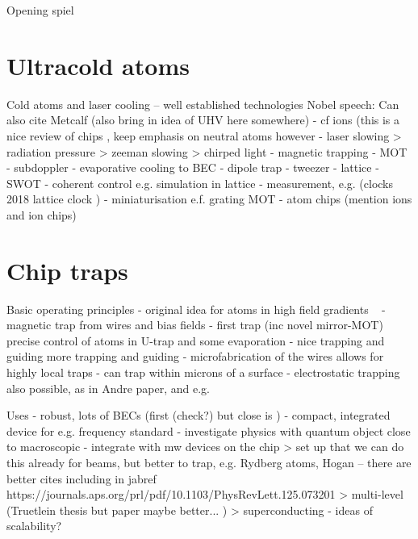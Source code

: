 
Opening spiel
\cite{Andre2006}

\section{Ultracold atoms}


Cold atoms and laser cooling -- well established technologies
Nobel speech: \cite{RevModPhys.70.721}
Can also cite Metcalf \cite{Metcalf1999}
(also bring in idea of UHV here somewhere)
- cf ions \cite{RevModPhys.62.531} (this is a nice review of chips \cite{Romaszko2020}, keep emphasis on neutral atoms however
- laser slowing
  > radiation pressure \cite{PhysRevLett.40.1639}
  > zeeman slowing \cite{PhysRevLett.48.596}
  > chirped light \cite{Prodan1984}
- magnetic trapping \cite{PhysRevLett.54.2596}
- MOT \cite{PhysRevLett.59.2631}
- subdoppler \cite{Dalibard:89}
- evaporative cooling to BEC \cite{Anderson198}
- dipole trap \cite{Chu1986}
- tweezer \cite{Schlosser2001}
- lattice \cite{PhysRevLett.81.3108}
- SWOT \cite{Wu2017}
- coherent control e.g. simulation in lattice \cite{Schäfer2020}
- measurement, e.g. (clocks 2018 lattice clock \cite{PhysRevX.8.021036})
- miniaturisation e.f. grating MOT \cite{Nshii2013}
- atom chips (mention ions and ion chips)

\section{Chip traps}

Basic operating principles
- original idea for atoms in high field gradients ~\cite{PhysRevA.52.4004}
- magnetic trap from wires and bias fields
- first trap \cite{Reichel1999} (inc novel mirror-MOT) precise control of
atoms in U-trap and some evaporation
- nice trapping and guiding \cite{Folman2000} more trapping and guiding
- microfabrication of the wires allows for highly local traps
- can trap within microns of a surface
- electrostatic trapping also possible, as in Andre paper, and e.g.
\cite{Bethlem2000}

Uses
- robust, lots of BECs (first (check?) \cite{Haensel2001} but close is \cite{Ott2001})
- compact, integrated device for e.g. frequency standard \cite{RAMIREZMARTINEZ2011247}
- investigate physics with quantum object close to macroscopic
- integrate with mw devices on the chip
    > set up that we can do this already for beams, but better to trap, e.g.
      Rydberg atoms, Hogan -- there are better cites including in jabref
      https://journals.aps.org/prl/pdf/10.1103/PhysRevLett.125.073201
    > multi-level (Truetlein thesis \cite{Treutlein2008} but paper maybe
      better... \cite{Boehi2009})
    > superconducting \cite{Bernon2013}
- ideas of scalability?

